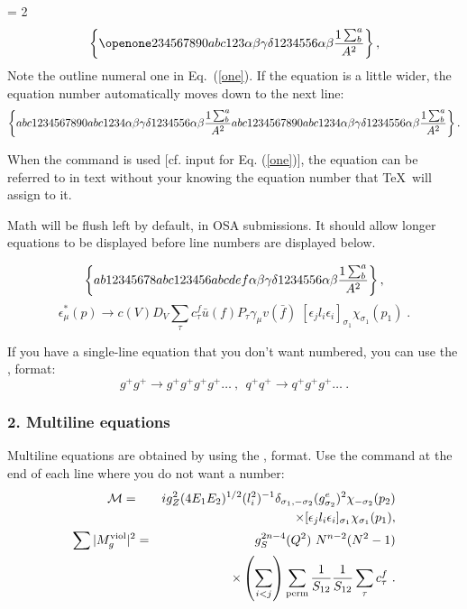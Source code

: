 \baselineskip = 2\baselineskip  %
\begin{equation}
\left\{\openone234567890abc123\alpha\beta\gamma\delta%
1234556\alpha\beta{1\sum^{a}_{b}\over A^2}\right\}\label{one},
\end{equation}
Note the outline numeral one in Eq.\ (\ref{one}).
If the equation is a little wider, the equation number automatically
moves down to the next line:
\begin{equation}
\left\{abc1234567890abc1234\alpha\beta\gamma\delta%
1234556\alpha\beta{1\sum^{a}_{b}\over A^2}
abc1234567890abc1234\alpha\beta\gamma\delta%
1234556\alpha\beta{1\sum^{a}_{b}\over A^2}\right\}.
\end{equation}

When the  command is used [cf. input
for Eq. (\ref{one})],
the equation can be referred to in text without your knowing the
equation number that \TeX\ will assign to it.

Math will be flush left by default, in OSA submissions.
It should allow longer equations to be displayed before line numbers
are displayed below.

\begin{equation}
\left\{ab12345678abc123456abcdef\alpha\beta\gamma\delta%
1234556\alpha\beta{1\sum^{a}_{b}\over A^2}\right\},
\end{equation}
\begin{equation}
\epsilon^\ast_\mu(p)\to c(V)D_V
\sum_\tau c^f_\tau \bar u(f)P_\tau
\gamma_\mu v( \bar f)\;
[\epsilon_jl_i\epsilon_i]_{\sigma_1}\chi_{\sigma_1}(p_1)\;.
\end{equation}


If you have a single-line equation that you don't want
numbered, you can use the \btt{[}, \btt{]} format:
\[g^+g^+ \rightarrow g^+g^+g^+g^+ \dots ~,~~q^+q^+\rightarrow
q^+g^+g^+ \dots ~. \]

\subsubsection*{2. Multiline equations}

Multiline equations are obtained by using the
,  format.
Use the 
command at the end of each line where you do not want a number:
\begin{eqnarray}
{\cal M}=&&ig_Z^2(4E_1E_2)^{1/2}(l_i^2)^{-1}
\delta_{\sigma_1,-\sigma_2}
(g_{\sigma_2}^e)^2\chi_{-\sigma_2}(p_2)\nonumber\\
&&\times
[\epsilon_jl_i\epsilon_i]_{\sigma_1}\chi_{\sigma_1}(p_1),  \\
\sum \vert M^{\rm viol}_g \vert ^2&=&g^{2n-4}_S(Q^2)~N^{n-2}
        (N^2-1)\nonumber \\
 & &\times \left( \sum_{i<j}\right)
  \sum_{\rm perm}
 {1 \over S_{12}}
 {1 \over S_{12}}\sum_\tau c^f_\tau~.
\end{eqnarray}


